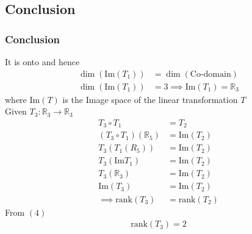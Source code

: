 \documentclass{beamer}
\providecommand{\brak}[1]{\ensuremath{\left(#1\right)}}
\theoremstyle{remark}
\numberwithin{equation}{section}
\begin{document}
\subsection{Conclusion}
\begin{frame}
\frametitle{Conclusion}
It is onto and hence
\begin{align}
   \dim\brak{\text{Im}\brak{T_1}}&= \dim\brak{\text{Co-domain}} \\
   \dim\brak{\text{Im}\brak{T_1}}&= 3 \implies \text{Im}\brak{T_1}=\mathbb{R}_3
\end{align}
where $\text{Im}\brak{T}$ is the Image space of the linear transformation $T$ \\
Given $T_3 : \mathbb{R}_3 \rightarrow \mathbb{R}_3 $ 
\begin{align}
    T_3 \circ T_1 &= T_2\\
   \brak{ T_3 \circ T_1}\brak{\mathbb{R}_5} &= \text{Im}\brak{T_2} \\
   T_3 \brak{T_1\brak{R_5}} &= \text{Im}\brak{T_2} \\
   T_3 \brak{\text{Im}T_1} &= \text{Im}\brak{T_2} \\
   T_3 \brak{\mathbb{R}_3} &= \text{Im}\brak{T_2} \\
   \text{Im}\brak{T_3} &= \text{Im}\brak{T_2} \\
   \implies  \text{rank}(T_3) &= \text{rank}(T_2)
\end{align}
From \brak{4}
\begin{align}
    \text{rank}(T_3)=2
\end{align}
 \end{frame}
\end{document}
